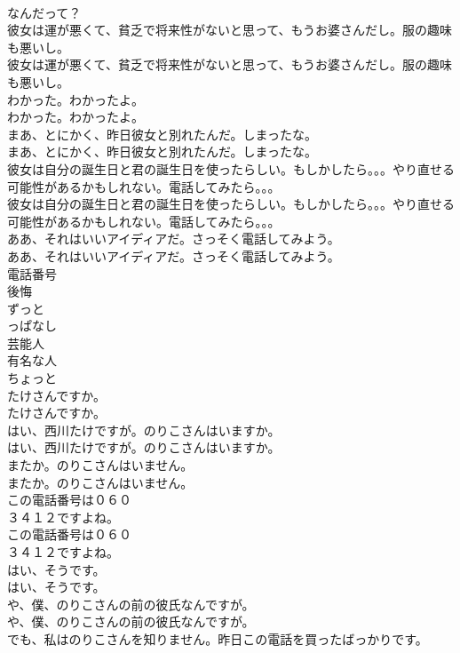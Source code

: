 \documentclass[8pt]{extreport}
\begin{document}
\begin{CJK}{UTF8}{min}
\\	なんだって？ 
\\	彼女は運が悪くて、貧乏で将来性がないと思って、もうお婆さんだし。服の趣味も悪いし。	
\\	彼女は運が悪くて、貧乏で将来性がないと思って、もうお婆さんだし。服の趣味も悪いし。 
\\	わかった。わかったよ。	
\\	わかった。わかったよ。 
\\	まあ、とにかく、昨日彼女と別れたんだ。しまったな。	
\\	まあ、とにかく、昨日彼女と別れたんだ。しまったな。 
\\	彼女は自分の誕生日と君の誕生日を使ったらしい。もしかしたら。。。やり直せる可能性があるかもしれない。電話してみたら。。。	
\\	彼女は自分の誕生日と君の誕生日を使ったらしい。もしかしたら。。。やり直せる可能性があるかもしれない。電話してみたら。。。 
\\	ああ、それはいいアイディアだ。さっそく電話してみよう。	
\\	ああ、それはいいアイディアだ。さっそく電話してみよう。 
\\	電話番号
\\	後悔
\\	ずっと
\\	っぱなし
\\	芸能人
\\	有名な人
\\	ちょっと
\\	たけさんですか。	
\\	たけさんですか。 
\\	はい、西川たけですが。のりこさんはいますか。	
\\	はい、西川たけですが。のりこさんはいますか。 
\\	またか。のりこさんはいません。	
\\	またか。のりこさんはいません。 
\\	この電話番号は０６０
\\	３４１２ですよね。	
\\	この電話番号は０６０
\\	３４１２ですよね。 
\\	はい、そうです。	
\\	はい、そうです。 
\\	や、僕、のりこさんの前の彼氏なんですが。	
\\	や、僕、のりこさんの前の彼氏なんですが。 
\\	でも、私はのりこさんを知りません。昨日この電話を買ったばっかりです。	

\end{CJK}
\end{document}
